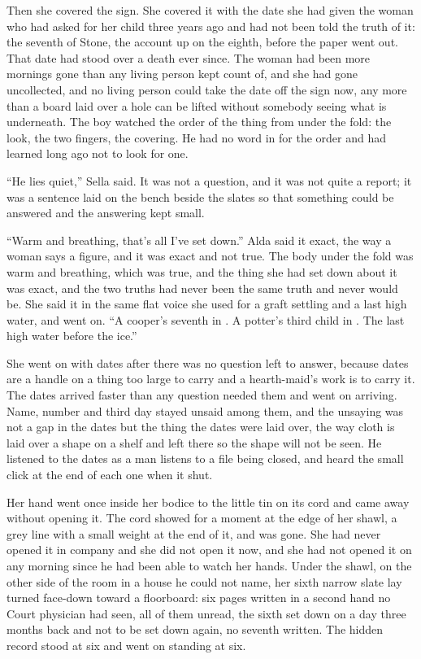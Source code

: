 Then she covered the sign. She covered it with the date she had given the woman who had asked for her child three years ago and had not been told the truth of it: the seventh of Stone, the account up on the eighth, before the paper went out. That date had stood over a death ever since. The woman had been more mornings gone than any living person kept count of, and she had gone uncollected, and no living person could take the date off the sign now, any more than a board laid over a hole can be lifted without somebody seeing what is underneath. The boy watched the order of the thing from under the fold: the look, the two fingers, the covering. He had no word in  for the order and had learned long ago not to look for one.

“He lies quiet,” Sella said. It was not a question, and it was not quite a report; it was a sentence laid on the bench beside the slates so that something could be answered and the answering kept small.

“Warm and breathing, that's all I've set down.” Alda said it exact, the way a woman says a figure, and it was exact and not true. The body under the fold was warm and breathing, which was true, and the thing she had set down about it was exact, and the two truths had never been the same truth and never would be. She said it in the same flat voice she used for a graft settling and a last high water, and went on. “A cooper's seventh in . A potter's third child in . The last high water before the ice.”

She went on with dates after there was no question left to answer, because dates are a handle on a thing too large to carry and a hearth-maid's work is to carry it. The dates arrived faster than any question needed them and went on arriving. Name, number and third day stayed unsaid among them, and the unsaying was not a gap in the dates but the thing the dates were laid over, the way cloth is laid over a shape on a shelf and left there so the shape will not be seen. He listened to the dates as a man listens to a file being closed, and heard the small click at the end of each one when it shut.

Her hand went once inside her bodice to the little tin on its cord and came away without opening it. The cord showed for a moment at the edge of her shawl, a grey line with a small weight at the end of it, and was gone. She had never opened it in company and she did not open it now, and she had not opened it on any morning since he had been able to watch her hands. Under the shawl, on the other side of the room in a house he could not name, her sixth narrow slate lay turned face-down toward a floorboard: six pages written in a second hand no Court physician had seen, all of them unread, the sixth set down on a day three months back and not to be set down again, no seventh written. The hidden record stood at six and went on standing at six.

